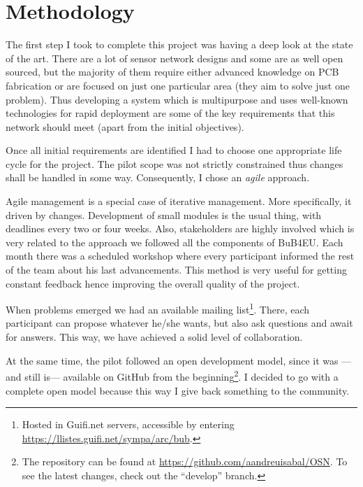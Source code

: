 
\chapter{Methodology} %

\label{Chapter4} %



The first step I took to complete this project was having a deep look at the state of the art. There are a lot of sensor network designs and some are as well open sourced, but the majority of them require either advanced knowledge on PCB fabrication or are focused on just one particular area (they aim to solve just one problem). Thus developing a system which is multipurpose and uses well-known technologies for rapid deployment are some of the key requirements that this network should meet (apart from the initial objectives).

Once all initial requirements are identified I had to choose one appropriate life cycle for the project. The pilot scope was not strictly constrained thus changes shall be handled in some way. Consequently, I chose an \emph{agile} approach.

Agile management is a special case of iterative management. More specifically, it driven by changes\cite{pmbok_agile}. Development of small modules is the usual thing, with deadlines every two or four weeks. Also, stakeholders are highly involved which is very related to the approach we followed all the components of BuB4EU. Each month there was a scheduled workshop where every participant informed the rest of the team about his last advancements. This method is very useful for getting constant feedback hence improving the overall quality of the project.

When problems emerged we had an available mailing list\footnote{Hosted in Guifi.net servers, accessible by entering \url{https://llistes.guifi.net/sympa/arc/bub}.}. There, each participant can propose whatever he/she wants, but also ask questions and await for answers. This way, we have achieved a solid level of collaboration.

At the same time, the pilot followed an open development model, since it was ---and still is--- available on GitHub from the beginning\footnote{The repository can be found at \url{https://github.com/aandreuisabal/OSN}. To see the latest changes, check out the ``develop'' branch.}. I decided to go with a complete open model because this way I give back something to the community.
